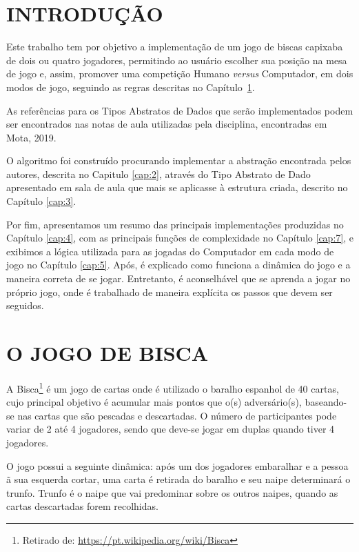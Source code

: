\documentclass[12pt, oneside, a4paper, brazil]{abntex2}
\begin{document}
\imprimircapa

\imprimirfolhaderosto

\tableofcontents*


\chapter*{INTRODUÇÃO}

Este trabalho tem por objetivo a implementação de um jogo de biscas capixaba de dois ou quatro jogadores, permitindo ao usuário escolher sua posição na mesa de jogo e, assim, promover uma competição Humano \textit{versus} Computador, em dois modos de jogo, seguindo as regras descritas no Capítulo~\ref{cap:1}.

As referências para os Tipos Abstratos de Dados que serão implementados podem ser encontrados nas notas de aula utilizadas pela disciplina, encontradas em Mota, 2019.

O algoritmo foi construído procurando implementar a abstração encontrada pelos autores, descrita no Capitulo \ref{cap:2}, através do Tipo Abstrato de Dado apresentado em sala de aula que mais se aplicasse à estrutura criada, descrito no Capítulo \ref{cap:3}.

Por fim, apresentamos um resumo das principais implementações produzidas no Capítulo \ref{cap:4}, com as principais funções de complexidade no Capítulo \ref{cap:7}, e exibimos a lógica utilizada para as jogadas do Computador em cada modo de jogo no Capítulo \ref{cap:5}. Após, é explicado como funciona a dinâmica do jogo e a maneira correta de se jogar. Entretanto, é aconselhável que se aprenda a jogar no próprio jogo, onde é trabalhado de maneira explícita os passos que devem ser seguidos.

\chapter{O JOGO DE BISCA}\label{cap:1}

A Bisca\footnote{Retirado de: \url{https://pt.wikipedia.org/wiki/Bisca}} é um jogo de cartas onde é utilizado o baralho espanhol de 40 cartas, cujo principal objetivo é acumular mais pontos que o(s) adversário(s), baseando-se nas cartas que são pescadas e descartadas. O número de participantes pode variar de 2 até 4 jogadores, sendo que deve-se jogar em duplas quando tiver 4 jogadores.

O jogo possui a seguinte dinâmica: após um dos jogadores embaralhar e a pessoa ã sua esquerda cortar, uma carta é retirada do baralho e seu naipe determinará o trunfo. Trunfo é o naipe que vai predominar sobre os outros naipes, quando as cartas descartadas forem recolhidas.
\end{document}
